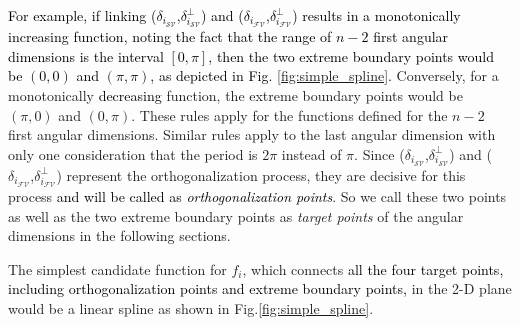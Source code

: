 \textcolor{black}{For example, if linking ($\delta_{i_{{\mathcal{SV}}}}$,$\delta^{\perp}_{i_{{\mathcal{SV}}}}$) and ($\delta_{i_{{\mathcal{FV}}}}$,$\delta^{\perp}_{i_{{\mathcal{FV}}}}$) results in a monotonically increasing function, noting the fact that the range of $n-2$ first angular dimensions is the interval $[0, \pi]$, then the two extreme boundary points would be $(0,0)$ and $(\pi,\pi)$, as depicted in Fig. \ref{fig:simple_spline}.} Conversely, for a monotonically \textcolor{black}{decreasing} function, the extreme boundary points would be $(\pi,0)$ and $(0,\pi)$. These rules apply for the functions defined for the $n-2$ first angular dimensions. 
Similar rules apply to the last angular dimension with only one consideration that the period is $2\pi$ instead of $\pi$. Since  ($\delta_{i_{{\mathcal{SV}}}}$,$\delta^{\perp}_{i_{{\mathcal{SV}}}}$) and ($\delta_{i_{{\mathcal{FV}}}}$,$\delta^{\perp}_{i_{{\mathcal{FV}}}}$) represent the orthogonalization process, they are decisive for this process \textcolor{black}{and will be called as \textit{orthogonalization points}}. So we call these two points as well as the two extreme boundary points as \textit{target points} of the angular dimensions in the following sections. %

The simplest candidate function for $f_i$, which connects \textcolor{black}{all the four target points, including orthogonalization points and extreme boundary points,} in the 2-D plane would be a linear spline as shown in Fig.\ref{fig:simple_spline}.


